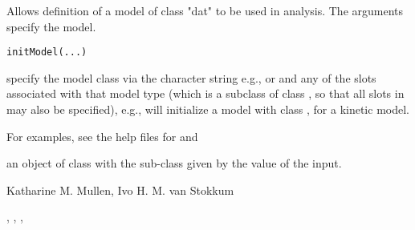 \documentclass{article}
\begin{document}
\begin{Description}\relax
Allows definition of a model of class "dat" to be used 
in analysis.  The arguments specify the model.
\end{Description}
\begin{Usage}
\begin{verbatim}
initModel(...)
\end{verbatim}
\end{Usage}
\begin{Arguments}
\begin{ldescription}
\item[\code{...}] specify the model class via the character string
e.g.,  or  and 
any of the slots associated with that model type (which is 
a subclass of class , so that all slots in  
may also be specified),   
e.g.,  will initialize a model with 
class , for a kinetic model.  
\end{ldescription}
\end{Arguments}
\begin{Details}\relax
For examples, see the help files for  and 
\end{Details}
\begin{Value}
an object of class  with the sub-class given by the value of 
the  input.
\end{Value}
\begin{Author}\relax
Katharine M. Mullen, Ivo H. M. van Stokkum
\end{Author}
\begin{SeeAlso}\relax
{}, , 
, 
\end{SeeAlso}
\end{document}
